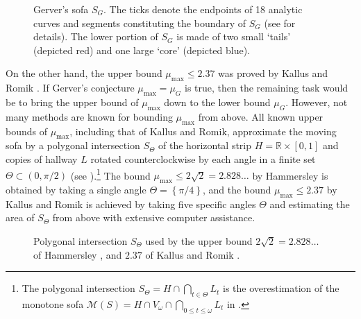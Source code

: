 \begin{figure}
\centering

\caption{Gerver’s sofa \(S_G\). The ticks denote the endpoints of 18 analytic curves and segments constituting the boundary of \(S_G\) (see \autocite{romikDifferentialEquationsExact2018} for details). The lower portion of \(S_G\) is made of two small ‘tails’ (depicted red) and one large ‘core’ (depicted blue).}
\label{fig:gerver}
\end{figure}

On the other hand, the upper bound \(\mu_{\max} \leq 2.37\) was proved by Kallus and Romik \autocite{kallusImprovedUpperBounds2018}. If Gerver’s conjecture \(\mu_{\max} = \mu_G\) is true, then the remaining task would be to bring the upper bound of \(\mu_{\max}\) down to the lower bound \(\mu_G\). However, not many methods are known for bounding \(\mu_{\max}\) from above. All known upper bounds of \(\mu_{\max}\), including that of Kallus and Romik, approximate the moving sofa by a polygonal intersection \(S_\Theta\) of the horizontal strip \(H = \mathbb{R} \times [0, 1]\) and copies of hallway \(L\) rotated counterclockwise by each angle in a finite set \(\Theta \subset (0, \pi/2)\) (see ).\footnote{The polygonal intersection \(S_\Theta = H \cap \bigcap_{t \in \Theta} L_t\) is the overestimation of the monotone sofa \(\mathcal{M}(S) = H \cap V_\omega \cap \bigcap_{0 \leq t \leq \omega} L_t\) in .} The bound \(\mu_{\max} \leq 2 \sqrt{2} = 2.828\dots\) by Hammersley \autocite{hammersley1968enfeeblement} is obtained by taking a single angle \(\Theta = \left\{ \pi/4 \right\}\), and the bound \(\mu_{\max} \leq 2.37\) by Kallus and Romik \autocite{kallusImprovedUpperBounds2018} is achieved by taking five specific angles \(\Theta\) and estimating the area of \(S_\Theta\) from above with extensive computer assistance.

\begin{figure}
\centering

\caption{Polygonal intersection \(S_\Theta\) used by the upper bound \(2 \sqrt{2} = 2.828\dots\) of Hammersley \autocite{hammersley1968enfeeblement}, and \(2.37\) of Kallus and Romik \autocite{kallusImprovedUpperBounds2018}.}
\label{fig:polygon-sofa}
\end{figure}

